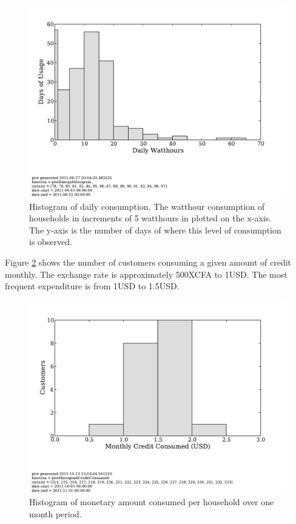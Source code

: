 \documentclass{sig-alternate}
\begin{document}
\begin{figure}[]
\begin{center}
\includegraphics[trim = 0in 1.3in 0in 0in, clip, width=\columnwidth]
                {figures/ml06Histogram.pdf}
\end{center}
\caption{Histogram of daily consumption.  The watthour consumption of households
in increments of 5 watthours in plotted on the x-axis.  The y-axis is the number of
days of where this level of consumption is observed.}
\label{ml06Histogram}
\end{figure}

Figure \ref{consumptionHistogram} shows the number of customers consuming
a given amount of credit monthly.  The exchange rate is approximately 500XCFA to 1USD.
The most frequent expenditure is from 1USD to 1.5USD.

\begin{figure}[]
\begin{center}
\includegraphics[trim = 0in 1.3in 0in 0in, clip, width=\columnwidth]
                {figures/consumptionHistogram.pdf}
\end{center}
\caption{Histogram of monetary amount consumed per household over one month period.}
\label{consumptionHistogram}
\end{figure}
\end{document}
